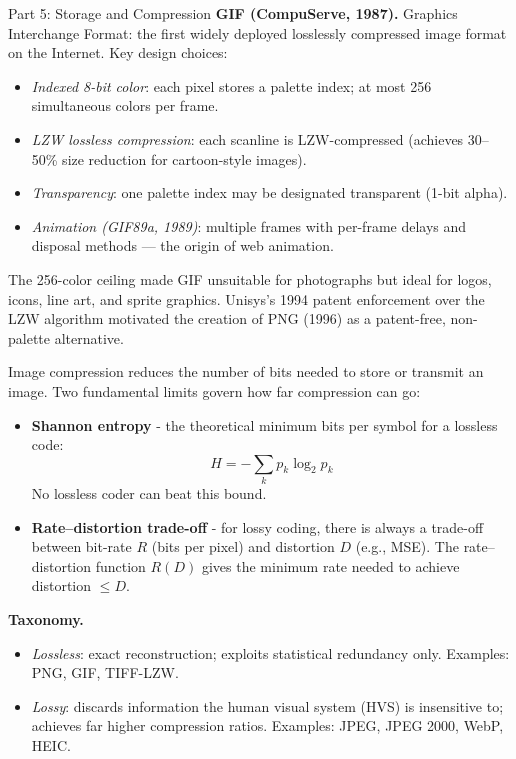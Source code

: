 \documentclass[letterpaper]{article}
\begin{document}
\begin{notes}{Part 5: Storage and Compression}
\textbf{GIF (CompuServe, 1987).} Graphics Interchange Format: the first widely deployed losslessly compressed image format on the Internet. Key design choices:
\begin{itemize}
    \item \emph{Indexed 8-bit color}: each pixel stores a palette index; at most 256 simultaneous colors per frame.
    \item \emph{LZW lossless compression}: each scanline is LZW-compressed (achieves 30--50\% size reduction for cartoon-style images).
    \item \emph{Transparency}: one palette index may be designated transparent (1-bit alpha).
    \item \emph{Animation (GIF89a, 1989)}: multiple frames with per-frame delays and disposal methods --- the origin of web animation.
\end{itemize}
The 256-color ceiling made GIF unsuitable for photographs but ideal for logos, icons, line art, and sprite graphics. Unisys's 1994 patent enforcement over the LZW algorithm motivated the creation of PNG (1996) as a patent-free, non-palette alternative.


\columnbreaknofill





Image compression reduces the number of bits needed to store or transmit an image. Two fundamental limits govern how far compression can go:
\begin{itemize}
    \item \textbf{Shannon entropy} - the theoretical minimum bits per symbol for a lossless code: 
    $$H = -\sum_k p_k \log_2 p_k$$
    No lossless coder can beat this bound.
    \item \textbf{Rate--distortion trade-off} - for lossy coding, there is always a trade-off between bit-rate $R$ (bits per pixel) and distortion $D$ (e.g., MSE). The rate--distortion function $R(D)$ gives the minimum rate needed to achieve distortion $\le D$.
\end{itemize}

\textbf{Taxonomy.}
\begin{itemize}
    \item \emph{Lossless}: exact reconstruction; exploits statistical redundancy only. Examples: PNG, GIF, TIFF-LZW.
    \item \emph{Lossy}: discards information the human visual system (HVS) is insensitive to; achieves far higher compression ratios. Examples: JPEG, JPEG 2000, WebP, HEIC.
\end{itemize}


\end{notes}
\end{document}
